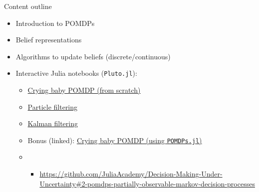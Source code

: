 \begin{frame}[fragile]{Content outline}

\begin{itemize}
    \item Introduction to POMDPs
    \item Belief representations
    \item Algorithms to update beliefs (discrete/continuous)
    \item Interactive Julia notebooks (\texttt{Pluto.jl}):
    \begin{itemize}
        \item \href{http://htmlview.glitch.me/?https://raw.githubusercontent.com/sisl/StateEstimation.jl/master/html/crying_baby_problem.html}{\color{cardinal}Crying baby POMDP (from scratch)}
        \item \href{http://htmlview.glitch.me/?https://raw.githubusercontent.com/sisl/StateEstimation.jl/master/html/particle_filter.html}{\color{cardinal}Particle filtering}
        \item \href{http://htmlview.glitch.me/?https://raw.githubusercontent.com/sisl/StateEstimation.jl/master/html/kalman_filter.html}{\color{cardinal}Kalman filtering}
        \item Bonus (linked): \href{https://htmlview.glitch.me/?https://github.com/JuliaAcademy/Decision-Making-Under-Uncertainty/blob/master/html/2-POMDPs.jl.html}{\color{cardinal}Crying baby POMDP (using \texttt{POMDPs.jl})}
        \item \begin{itemize}
            \item \url{https://github.com/JuliaAcademy/Decision-Making-Under-Uncertainty#2-pomdps-partially-observable-markov-decision-processes}
        \end{itemize}
    \end{itemize}
\end{itemize}

\end{frame}